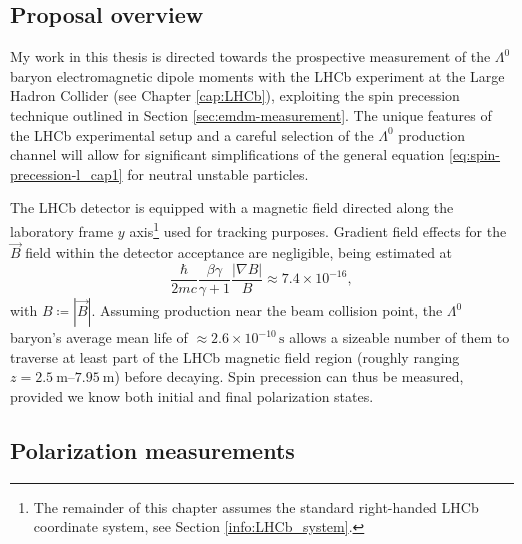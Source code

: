 \subsection{Proposal overview}
My work in this thesis is directed towards the prospective measurement of the $\Lambda^0$ baryon electromagnetic dipole moments with the LHCb experiment at the Large Hadron Collider (see Chapter \ref{cap:LHCb}), exploiting the spin precession technique outlined in Section \ref{sec:emdm-measurement}.
The unique features of the LHCb experimental setup and a careful selection of the $\Lambda^0$ production channel will allow for significant simplifications of the general equation \eqref{eq:spin-precession-l_cap1} for neutral unstable particles.

The LHCb detector is equipped with a magnetic field directed along the laboratory frame $y$ axis\footnote{The remainder of this chapter assumes the standard right-handed LHCb coordinate system, see Section \ref{info:LHCb_system}.} used for tracking purposes. Gradient field effects for the $\vec{B}$ field within the detector acceptance are negligible, being estimated at \cite{EMDipoleSearch}
\begin{equation}
\frac{\hbar}{2mc} \frac{\beta\gamma}{\gamma+1} \frac{|\nabla B|}{B} \approx 7.4 \times {10}^{-16},
\end{equation}
with $B \coloneqq |\vec{B}|$.
Assuming production near the beam collision point, the $\Lambda^0$ baryon's average mean life of $\approx 2.6 \times {10}^{-10}\, \si{\second}$ \cite{PDG} allows a sizeable number of them to traverse at least part of the LHCb magnetic field region (roughly ranging $z=\SI{2.5}{\meter}$--$\SI{7.95}{\meter}$) before decaying.
Spin precession can thus be measured, provided we know both initial and final polarization states.


\subsection{Polarization measurements}

